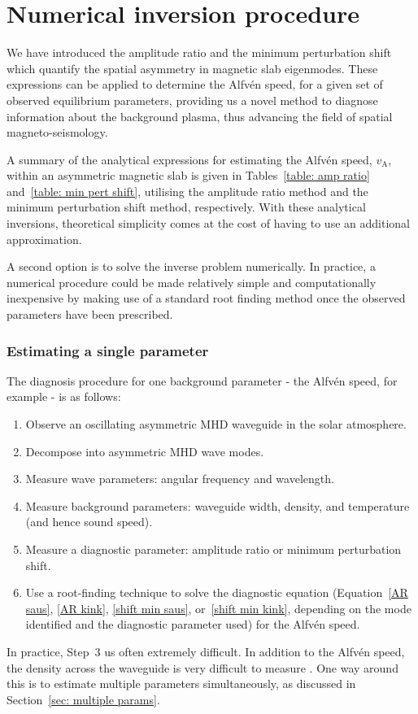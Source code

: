\documentclass[12pt]{../style-files/ociamthesis}
\begin{document}
\section{Numerical inversion procedure}
\label{sec: numerical inversion}

We have introduced the amplitude ratio and the minimum perturbation shift which quantify the spatial asymmetry in magnetic slab eigenmodes. These expressions can be applied to determine the Alfv\'{e}n speed, for a given set of observed equilibrium parameters, providing us a novel method to diagnose information about the background plasma, thus advancing the field of spatial magneto-seismology.

A summary of the analytical expressions for estimating the Alfv\'{e}n speed, $v_\textrm{A}$, within an asymmetric magnetic slab is given in Tables~\ref{table: amp ratio} and~\ref{table: min pert shift}, utilising the amplitude ratio method and the minimum perturbation shift method, respectively. With these analytical inversions, theoretical simplicity comes at the cost of having to use an additional approximation.

A second option is to solve the inverse problem numerically. In practice, a numerical procedure could be made relatively simple and computationally inexpensive by making use of a standard root finding method once the observed parameters have been prescribed.


\subsubsection{Estimating a single parameter} \label{sec: single param}

The diagnosis procedure for one background parameter - the Alfv\'{e}n speed, for example - is as follows:
\begin{enumerate}
	\item Observe an oscillating asymmetric MHD waveguide in the solar atmosphere.
	\item Decompose into asymmetric MHD wave modes.
	\item Measure wave parameters: angular frequency and wavelength.
	\item Measure background parameters: waveguide width, density, and temperature (and hence sound speed).
	\item Measure a diagnostic parameter: amplitude ratio or minimum perturbation shift.
	\item Use a root-finding technique to solve the diagnostic equation (Equation~\eqref{AR saus}, \eqref{AR kink}, \eqref{shift min saus}, or~\eqref{shift min kink}, depending on the mode identified and the diagnostic parameter used) for the Alfv\'{e}n speed.
\end{enumerate}
In practice, Step~3 us often extremely difficult. In addition to the Alfv\'{e}n speed, the density across the waveguide is very difficult to measure \citep{war_etal09}. One way around this is to estimate multiple parameters simultaneously, as discussed in Section~\ref{sec: multiple params}.
\end{document}
